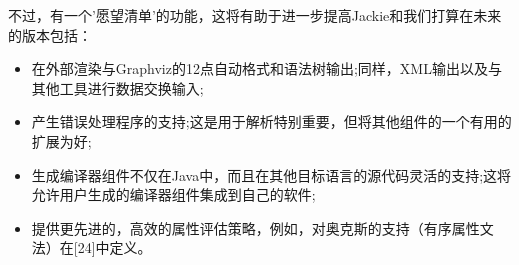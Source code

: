 不过，有一个'愿望清单'的功能，这将有助于进一步提高Jackie和我们打算在未来的版本包括：
\begin{itemize}
	\item 在外部渲染与Graphviz的12点自动格式和语法树输出;同样，XML输出以及与其他工具进行数据交换输入;
	\item 产生错误处理程序的支持;这是用于解析特别重要，但将其他组件的一个有用的扩展为好;
	\item 生成编译器组件不仅在Java中，而且在其他目标语言的源代码灵活的支持;这将允许用户生成的编译器组件集成到自己的软件;
	\item 提供更先进的，高效的属性评估策略，例如，对奥克斯的支持（有序属性文法）在[24]中定义。
\end{itemize}